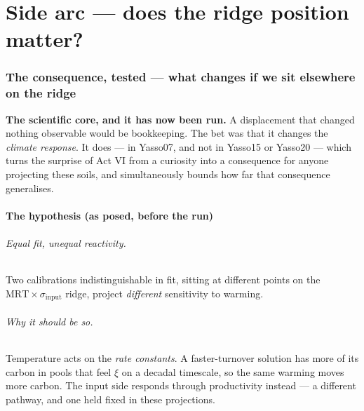 \documentclass[11pt]{article}
\newcommand{\sinput}{\sigma_{\mathrm{input}}}
\begin{document}
\part{Side arc \textnormal{---} does the ridge position matter?}

\section{The consequence, tested --- what changes if we sit elsewhere on the ridge}
\begin{note}
\textbf{The scientific core, and it has now been run.} A displacement that changed nothing observable
would be bookkeeping. The bet was that it changes the \emph{climate response}. It does --- in
Yasso07, and not in Yasso15 or Yasso20 --- which turns the surprise of Act VI from a curiosity into a
consequence for anyone projecting these soils, and simultaneously bounds how far that consequence
generalises.
\end{note}

\subsection{The hypothesis (as posed, before the run)}
\paragraph{Equal fit, unequal reactivity.} Two calibrations indistinguishable in fit, sitting at
different points on the $\mathrm{MRT} \times \sinput$ ridge, project \emph{different} sensitivity to
warming.

\paragraph{Why it should be so.} Temperature acts on the \emph{rate constants}. A faster-turnover
solution has more of its carbon in pools that feel $\xi$ on a decadal timescale, so the same warming
moves more carbon. The input side responds through productivity instead --- a different pathway, and
one held fixed in these projections.
\end{document}
